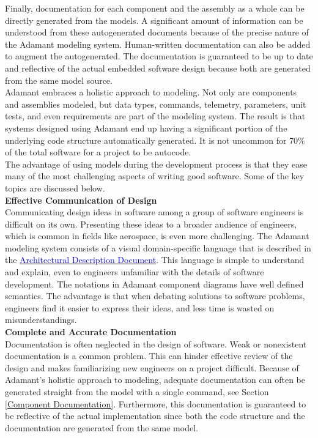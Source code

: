 Finally, documentation for each component and the assembly as a whole can be directly generated from the models. A significant amount of information can be understood from these autogenerated documents because of the precise nature of the Adamant modeling system. Human-written documentation can also be added to augment the autogenerated. The documentation is guaranteed to be up to date and reflective of the actual embedded software design because both are generated from the same model source. \\

Adamant embraces a holistic approach to modeling. Not only are components and assemblies modeled, but data types, commands, telemetry, parameters, unit tests, and even requirements are part of the modeling system. The result is that systems designed using Adamant end up having a significant portion of the underlying code structure automatically generated. It is not uncommon for 70\% of the total software for a project to be autocode. \\
 
The advantage of using models during the development process is that they ease many of the most challenging aspects of writing good software. Some of the key topics are discussed below. \\

\textbf{Effective Communication of Design} \\

Communicating design ideas in software among a group of software engineers is difficult on its own. Presenting these ideas to a broader audience of engineers, which is common in fields like aerospace, is even more challenging. The Adamant modeling system consists of a visual domain-specific language that is described in the \href{https://github.com/lasp/adamant/blob/main/doc/architecture_description_document/architecture_description_document.pdf}{\textcolor{blue}{Architectural Description Document}}. This language is simple to understand and explain, even to engineers unfamiliar with the details of software development. The notations in Adamant component diagrams have well defined semantics. The advantage is that when debating solutions to software problems, engineers find it easier to express their ideas, and less time is wasted on misunderstandings. \\

\textbf{Complete and Accurate Documentation} \\

Documentation is often neglected in the design of software. Weak or nonexistent documentation is a common problem. This can hinder effective review of the design and makes familiarizing new engineers on a project difficult. Because of Adamant's holistic approach to modeling, adequate documentation can often be generated straight from the model with a single command, see Section \ref{Component Documentation}. Furthermore, this documentation is guaranteed to be reflective of the actual implementation since both the code structure and the documentation are generated from the same model.  \\

